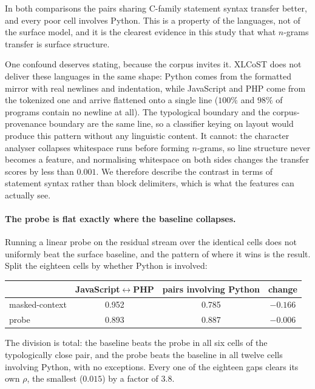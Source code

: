 In both comparisons the pairs sharing C-family statement syntax transfer
better, and every poor cell involves Python. This is a property of the
languages, not of the surface model, and it is the clearest evidence in this
study that what $n$-grams transfer is surface structure.

One confound deserves stating, because the corpus invites it. XLCoST does not
deliver these languages in the same shape: Python comes from the formatted
mirror with real newlines and indentation, while JavaScript and PHP come from
the tokenized one and arrive flattened onto a single line ($100\%$ and $98\%$
of programs contain no newline at all). The typological boundary and the
corpus-provenance boundary are the same line, so a classifier keying on layout
would produce this pattern without any linguistic content. It cannot: the
character analyser collapses whitespace runs before forming $n$-grams, so line
structure never becomes a feature, and normalising whitespace on both sides
changes the transfer scores by less than $0.001$. We therefore describe the
contrast in terms of statement syntax rather than block delimiters, which is
what the features can actually see.

\paragraph{The probe is flat exactly where the baseline collapses.} Running a
linear probe on the residual stream over the identical cells does not
uniformly beat the surface baseline, and the pattern of where it wins is the
result. Split the eighteen cells by whether Python is involved:

\begin{center}
\begin{tabular}{lccc}
\toprule
 & JavaScript$\leftrightarrow$PHP & pairs involving Python & change \\
\midrule
masked-context & 0.952 & 0.785 & $-0.166$ \\
probe          & 0.893 & 0.887 & $-0.006$ \\
\bottomrule
\end{tabular}
\end{center}

\noindent The division is total: the baseline beats the probe in all six cells
of the typologically close pair, and the probe beats the baseline in all twelve
cells involving Python, with no exceptions. Every one of the eighteen gaps
clears its own $\rho$, the smallest ($0.015$) by a factor of $3.8$.

